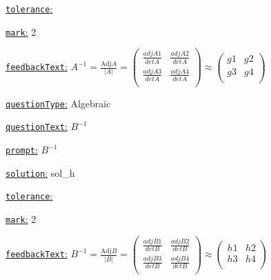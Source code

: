 \documentclass[preview]{standalone}
\newcommand \fieldname[1]{\underline{\texttt{#1}:}}
\begin{document}
\fieldname{tolerance}


\fieldname{mark}
2

\fieldname{feedbackText}
$A^{-1} = \frac{\textrm{Adj}A}{|A|} = \left( {\begin{array}{cc}
    \frac{{adjA1}}{{detA}} & \frac{{adjA2}}{{detA}} \\
    \frac{{adjA3}}{{detA}} & \frac{{adjA4}}{{detA}} \\
  \end{array} } \right) \approx \left( {\begin{array}{cc}
       {g1} & {g2} \\
       {g3} & {g4} \\
      \end{array} } \right) $

\fieldname{questionType}
Algebraic

\fieldname{questionText}
$B^{-1}$

\fieldname{prompt}
$B^{-1}$

\fieldname{solution}
sol_h

\fieldname{tolerance}


\fieldname{mark}
2

\fieldname{feedbackText}
$B^{-1} = \frac{\textrm{Adj}B}{|B|} = \left( {\begin{array}{cc}
    \frac{{adjB1}}{{detB}} & \frac{{adjB2}}{{detB}} \\
    \frac{{adjB3}}{{detB}} & \frac{{adjB4}}{{detB}} \\
  \end{array} } \right) \approx \left( {\begin{array}{cc}
       {h1} & {h2} \\
       {h3} & {h4} \\
      \end{array} } \right)$

\end{document}
